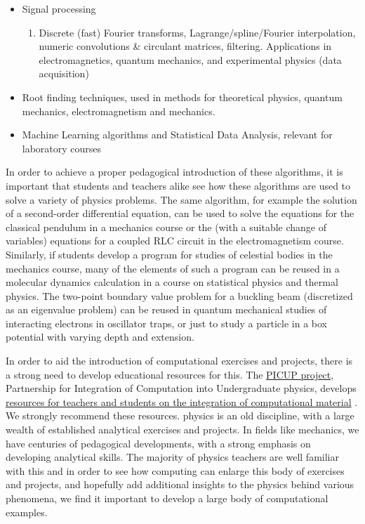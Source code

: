 \documentclass[graybox,envcountchap,sectrefs]{svmult}
\begin{document}
\begin{itemize}
\begin{enumerate}
\end{enumerate}


\item Signal processing
\begin{enumerate}

  \item Discrete (fast) Fourier transforms, Lagrange/spline/Fourier interpolation, numeric convolutions {\&} circulant matrices, filtering. Applications in electromagnetics, quantum mechanics, and experimental physics (data acquisition)

\end{enumerate}


\item Root finding techniques, used in methods for theoretical physics, quantum mechanics, electromagnetism and mechanics.

\item Machine Learning algorithms and Statistical Data Analysis, relevant for laboratory courses
\end{itemize}


In order to achieve a proper pedagogical introduction of these
algorithms, it is important that students and teachers alike see how
these algorithms are used to solve a variety of physics problems. The
same algorithm, for example the solution of a second-order
differential equation, can be used to solve the equations for the
classical pendulum in a mechanics course or the (with a suitable
change of variables) equations for a coupled RLC circuit in the
electromagnetism course. Similarly, if students develop a program for
studies of celestial bodies in the mechanics course, many of the
elements of such a program can be reused in a molecular dynamics
calculation in a course on statistical physics and thermal
physics. The two-point boundary value problem for a buckling beam
(discretized as an eigenvalue problem) can be reused in quantum
mechanical studies of interacting electrons in oscillator traps, or
just to study a particle in a box potential with varying depth and
extension.

In order to aid the introduction of computational exercises and
projects, there is a strong need to develop educational resources for this. The
\href{{http://www.compadre.org/picup/}}{PICUP project}, Partnership for
Integration of Computation into Undergraduate physics, develops
\href{{http://www.compadre.org/PICUP/resources/}}{resources for teachers and students on the integration of
computational material} \cite{PICUP}.
We strongly recommend these resources.  physics is an old discipline,
with a large wealth of established analytical exercises and
projects. In fields like mechanics, we have centuries of pedagogical
developments, with a strong emphasis on developing analytical
skills. The majority of physics teachers are well familiar with this
and in order to see how computing  can enlarge this body of exercises
and projects, and hopefully add additional insights to the physics
behind various phenomena, we find it important to develop a large body
of computational examples.
\end{document}
